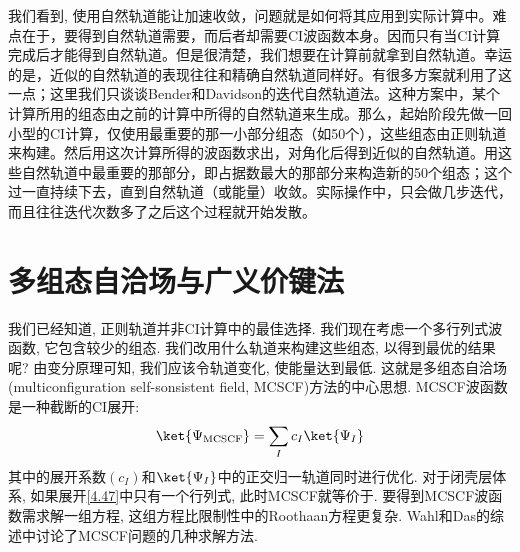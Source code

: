 我们看到, 使用自然轨道能让加速收敛，问题就是如何将其应用到实际计算中。难点在于，要得到自然轨道需要，而后者却需要CI波函数本身。因而只有当CI计算完成后才能得到自然轨道。但是很清楚，我们想要在计算前就拿到自然轨道。幸运的是，近似的自然轨道的表现往往和精确自然轨道同样好。有很多方案就利用了这一点；这里我们只谈谈Bender和Davidson的迭代自然轨道法。这种方案中，某个计算所用的组态由之前的计算中所得的自然轨道来生成。那么，起始阶段先做一回小型的CI计算，仅使用最重要的那一小部分组态（如50个），这些组态由正则\hft 轨道来构建。然后用这次计算所得的波函数求出，对角化后得到近似的自然轨道。用这些自然轨道中最重要的那部分，即占据数最大的那部分来构造新的50个组态；这个过一直持续下去，直到自然轨道（或能量）收敛。实际操作中，只会做几步迭代，而且往往迭代次数多了之后这个过程就开始发散。
\section{多组态自洽场与广义价键法}
\label{sec4.5}
我们已经知道, 
正则\hft 轨道并非CI计算中的最佳选择. 
我们现在考虑一个多行列式波函数, 
它包含较少的组态. 
我们改用什么轨道来构建这些组态, 
以得到最优的结果呢? 由变分原理可知, 
我们应该令轨道变化, 
使能量达到最低. 
这就是多组态自洽场(multiconfiguration self-sonsistent field, 
MCSCF)方法的中心思想. 
MCSCF波函数是一种截断的CI展开:
\begin{align}
\ket{\Psi_\mathrm{MCSCF}} = \sum_I c_I\ket{\Psi_I}
\label{4.47}
\end{align}
其中的展开系数$(c_I)$和$\ket{\Psi_I}$中的正交归一轨道同时进行优化. 对于闭壳层体系, 如果展开\autoref{4.47}中只有一个行列式, 此时MCSCF就等价于\hft. 要得到MCSCF波函数需求解一组方程, 这组方程比限制性\hft 中的Roothaan方程更复杂. Wahl和Das的综述中讨论了MCSCF问题的几种求解方法.


